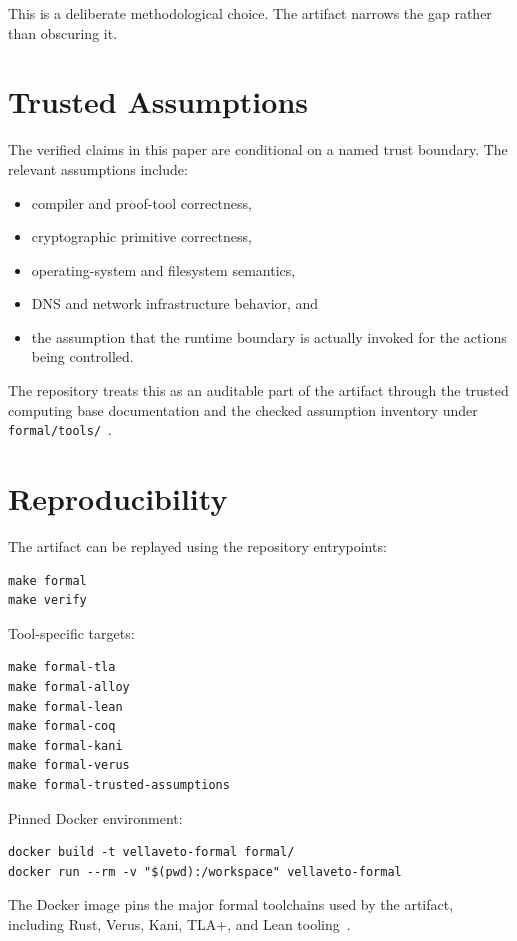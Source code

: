 \documentclass[11pt]{article}
\begin{document}
This is a deliberate methodological choice. The artifact narrows the gap rather
than obscuring it.

\section{Trusted Assumptions}

The verified claims in this paper are conditional on a named trust boundary.
The relevant assumptions include:

\begin{itemize}[leftmargin=*]
\item compiler and proof-tool correctness,
\item cryptographic primitive correctness,
\item operating-system and filesystem semantics,
\item DNS and network infrastructure behavior, and
\item the assumption that the runtime boundary is actually invoked for the
actions being controlled.
\end{itemize}

The repository treats this as an auditable part of the artifact through the
trusted computing base documentation and the checked assumption inventory under
\texttt{formal/tools/}~\cite{vellavetoTCB}.

\section{Reproducibility}

The artifact can be replayed using the repository entrypoints:

\begin{verbatim}
make formal
make verify
\end{verbatim}

Tool-specific targets:

\begin{verbatim}
make formal-tla
make formal-alloy
make formal-lean
make formal-coq
make formal-kani
make formal-verus
make formal-trusted-assumptions
\end{verbatim}

Pinned Docker environment:

\begin{verbatim}
docker build -t vellaveto-formal formal/
docker run --rm -v "$(pwd):/workspace" vellaveto-formal
\end{verbatim}

The Docker image pins the major formal toolchains used by the artifact,
including Rust, Verus, Kani, TLA+, and Lean tooling~\cite{vellavetoFormalDocker}.
\end{document}
